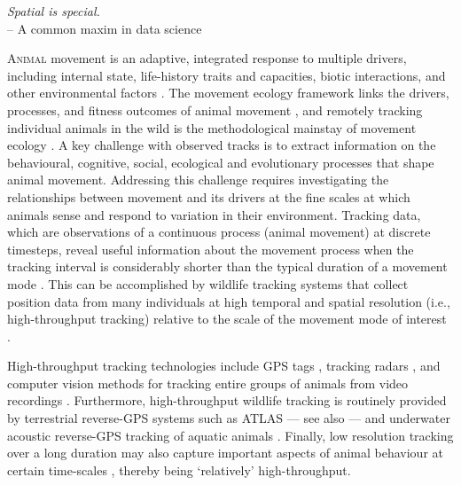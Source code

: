 

\begin{center}
\emph{Spatial is special.}\\
\medskip
-- \small{A common maxim in data science}
\end{center}

\lettrine{A}{nimal} movement is an adaptive, integrated response to multiple drivers, including internal state, life-history traits and capacities, biotic interactions, and other environmental factors \citep{nathan2008a, holyoak2008}.
The movement ecology framework links the drivers, processes, and fitness outcomes of animal movement \citep{nathan2008a}, and remotely tracking individual animals in the wild is the methodological mainstay of movement ecology \citep{wikelski2007,nathan2008a,hussey2015,kays2015}.
A key challenge with observed tracks is to extract information on the behavioural, cognitive, social, ecological and evolutionary processes that shape animal movement.
Addressing this challenge requires investigating the relationships between movement and its drivers at the fine scales at which animals sense and respond to variation in their environment. 
Tracking data, which are observations of a continuous process (animal movement) at discrete timesteps, reveal useful information about the movement process when the tracking interval is considerably shorter than the typical duration of a movement mode \citep{nathan2008a, noonan2019, getz2008}.
This can be accomplished by wildlife tracking systems that collect position data from many individuals at high temporal and spatial resolution (i.e., high-throughput tracking) relative to the scale of the movement mode of interest \citep{getz2008}.

High-throughput tracking technologies include GPS tags \citep{strandburg-peshkin2015, papageorgiou2019, harel2016, klarevas-irby2021}, tracking radars \citep{horvitz2014}, and computer vision methods for tracking entire groups of animals from video recordings \citep{rathore2020, perez-escudero2014}. 
Furthermore, high-throughput wildlife tracking is routinely provided by terrestrial reverse-GPS systems such as ATLAS \citep[Advanced Tracking and Localization of Animals in real-life Systems:][]{toledo2014, weiser2016, toledo2016,toledo2020} --- see also \citep{maccurdy2009, maccurdy2019} --- and underwater acoustic reverse-GPS tracking of aquatic animals \citep{baktoft2019, baktoft2017, jung2015, aspillaga2021, aspillaga2021a}.
Finally, low resolution tracking over a long duration may also capture important aspects of animal behaviour at certain time-scales \citep[e.g. migration, long-range dispersal;][]{getz2008}, thereby being `relatively' high-throughput.


